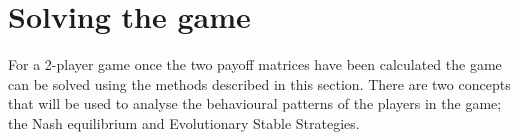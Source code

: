 \section{Solving the game}

For a 2-player game once the two payoff matrices have been calculated
the game can be solved using the methods described in this section.
There are two concepts that will be used to analyse the behavioural patterns
of the players in the game; the Nash equilibrium and Evolutionary Stable
Strategies.
